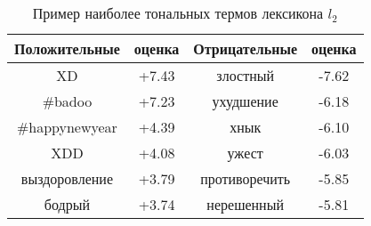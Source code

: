 \begin{table}[htp!] \centering
\caption{Пример наиболее тональных термов лексикона $l_2$}
\label{table:jan_lexicon}
\begin{tabular}{cccc}
\hline
\multicolumn{1}{c|}{Положительные}& \multicolumn{1}{c|}{оценка} & \multicolumn{1}{c|}{Отрицательные} & оценка \\ \hline
XD                                & +7.43                       & злостный                           & -7.62 \\
\#badoo                           & +7.23                       & ухудшение                          & -6.18 \\
\#happynewyear                    & +4.39                       & хнык                               & -6.10 \\
XDD                               & +4.08                       & ужест                              & -6.03 \\
выздоровление                     & +3.79                       & противоречить                      & -5.85 \\
бодрый                            & +3.74                       & нерешенный                         & -5.81 \\ \hline
\end{tabular}
\end{table}
